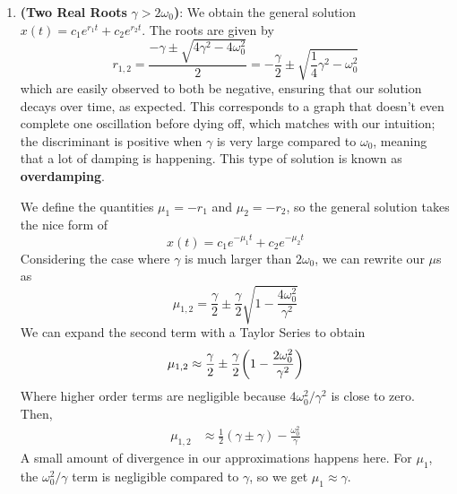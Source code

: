 \begin{enumerate}
    \item \textbf{(Two Real Roots} $\gamma > 2\omega_0$\textbf{)}: We obtain the general solution $x(t) = c_1e^{r_1t} + c_2e^{r_2t}$. The roots are given by 
    \[ r_{1,2} = \frac{-\gamma \pm \sqrt{4\gamma ^2-4\omega_0^2}}{2} = -\frac{\gamma}{2} \pm \sqrt{\frac{1}{4}\gamma^2-\omega_0^2} \]
    which are easily observed to both be negative, ensuring that our solution decays over time, as expected. This corresponds to a graph that doesn't even complete one oscillation before dying off, which matches with our intuition; the discriminant is positive when $\gamma$ is very large compared to $\omega_0$, meaning that a lot of damping is happening. This type of solution is known as \textbf{overdamping}.

    We define the quantities $\mu_1 = -r_1$ and $\mu_2 = -r_2$, so the general solution takes the nice form of
    \[ x(t) = c_1e^{-\mu_1 t} + c_2e^{-\mu_2 t} \]
    Considering the case where $\gamma$ is much larger than $2\omega_0$, we can rewrite our $\mu$s as
    \[ \mu_{1,2} = \frac{\gamma}{2} \pm\frac{\gamma}{2}\sqrt{1 - \frac{4\omega_0^2}{\gamma^2}}\]
    We can expand the second term with a Taylor Series to obtain
    \[ \mu_{1,2} \approx\frac{\gamma}{2} \pm \frac{\gamma}{2}\pqty{1 - \frac{2\omega_0^2}{\gamma^2}}\]
    Where higher order terms are negligible because $4\omega_0^2/\gamma^2$ is close to zero. Then,
    \begin{align*}
        \mu_{1,2} &\approx \frac{1}{2}(\gamma\pm \gamma)  - \frac{\omega_0^2}{\gamma}
    \end{align*}
    A small amount of divergence in our approximations happens here. For $\mu_1$, the $\omega_0^2/\gamma$ term is negligible compared to $\gamma$, so we get $\mu_1 \approx \gamma$.


\end{enumerate}
